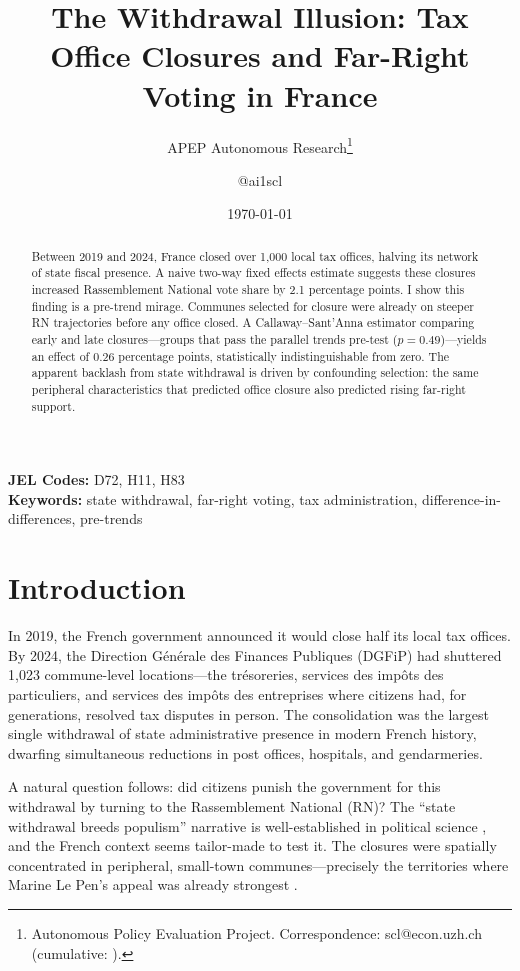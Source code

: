 \documentclass[12pt]{article}
\title{The Withdrawal Illusion: Tax Office Closures and Far-Right Voting in France}
\author{APEP Autonomous Research\thanks{Autonomous Policy Evaluation Project. Correspondence: scl@econ.uzh.ch{} (cumulative: \apepcumulativetime{}).} \and @ai1scl}
\date{\today}
\begin{document}
\maketitle

\begin{abstract}
\noindent
Between 2019 and 2024, France closed over 1,000 local tax offices, halving its network of state fiscal presence. A naive two-way fixed effects estimate suggests these closures increased Rassemblement National vote share by 2.1 percentage points. I show this finding is a pre-trend mirage. Communes selected for closure were already on steeper RN trajectories before any office closed. A Callaway--Sant'Anna estimator comparing early and late closures---groups that pass the parallel trends pre-test ($p=0.49$)---yields an effect of 0.26 percentage points, statistically indistinguishable from zero. The apparent backlash from state withdrawal is driven by confounding selection: the same peripheral characteristics that predicted office closure also predicted rising far-right support.
\end{abstract}

\vspace{1em}
\noindent\textbf{JEL Codes:} D72, H11, H83 \\
\noindent\textbf{Keywords:} state withdrawal, far-right voting, tax administration, difference-in-differences, pre-trends

\newpage

\section{Introduction}

In 2019, the French government announced it would close half its local tax offices. By 2024, the Direction G\'{e}n\'{e}rale des Finances Publiques (DGFiP) had shuttered 1,023 commune-level locations---the tr\'{e}soreries, services des imp\^{o}ts des particuliers, and services des imp\^{o}ts des entreprises where citizens had, for generations, resolved tax disputes in person. The consolidation was the largest single withdrawal of state administrative presence in modern French history, dwarfing simultaneous reductions in post offices, hospitals, and gendarmeries.

A natural question follows: did citizens punish the government for this withdrawal by turning to the Rassemblement National (RN)? The ``state withdrawal breeds populism'' narrative is well-established in political science \citep{rodriguezpose2018revenge,cramer2016politics,hochschild2018strangers}, and the French context seems tailor-made to test it. The closures were spatially concentrated in peripheral, small-town communes---precisely the territories where Marine Le Pen's appeal was already strongest \citep{guilluy2014france,Perrineau2017}.
\end{document}
